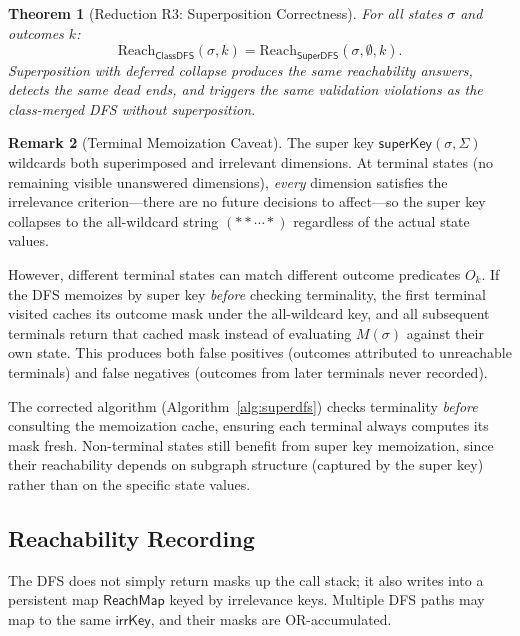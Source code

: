 \documentclass[11pt]{article}
\newtheorem{theorem}{Theorem}[section]
\theoremstyle{definition}
\newtheorem{remark}[theorem]{Remark}
\newcommand{\sel}{\sigma}              %
\newcommand{\ik}{\mathsf{irrKey}}      %
\newcommand{\Reach}{\mathrm{Reach}}    %
\begin{document}
\begin{theorem}[Reduction R3: Superposition Correctness]\label{thm:super}
For all states $\sel$ and outcomes $k$:
\[
  \Reach_{\textsf{ClassDFS}}(\sel,k)
  = \Reach_{\textsf{SuperDFS}}(\sel,\emptyset,k).
\]
Superposition with deferred collapse produces the same reachability
answers, detects the same dead ends, and triggers the same validation
violations as the class-merged DFS without superposition.
\end{theorem}

\begin{remark}[Terminal Memoization Caveat]\label{rem:termmemo}
The super key $\mathsf{superKey}(\sel,\Sigma)$ wildcards both
superimposed and irrelevant dimensions. At terminal states (no remaining
visible unanswered dimensions), \emph{every} dimension satisfies the
irrelevance criterion---there are no future decisions to affect---so the
super key collapses to the all-wildcard string $(**\cdots*)$ regardless of
the actual state values.

However, different terminal states can match different outcome predicates
$O_k$. If the DFS memoizes by super key \emph{before} checking terminality,
the first terminal visited caches its outcome mask under the all-wildcard
key, and all subsequent terminals return that cached mask instead of
evaluating $M(\sel)$ against their own state. This produces both false
positives (outcomes attributed to unreachable terminals) and false
negatives (outcomes from later terminals never recorded).

The corrected algorithm (Algorithm~\ref{alg:superdfs}) checks terminality
\emph{before} consulting the memoization cache, ensuring each terminal
always computes its mask fresh. Non-terminal states still benefit from
super key memoization, since their reachability depends on subgraph
structure (captured by the super key) rather than on the specific state
values.
\end{remark}

\subsection{Reachability Recording}\label{sec:recordreach}

The DFS does not simply return masks up the call stack; it also writes
into a persistent map $\mathsf{ReachMap}$ keyed by irrelevance keys.
Multiple DFS paths may map to the same $\ik$, and their masks are
OR-accumulated.
\end{document}
